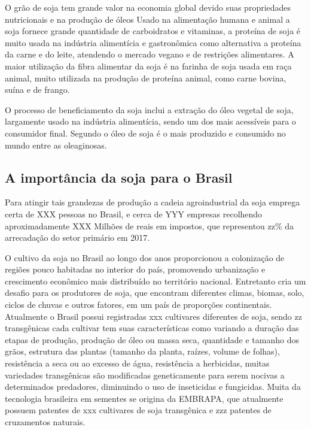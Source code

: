 O grão de soja tem grande valor na economia global devido suas propriedades nutricionais e na produção de óleos
Usado na alimentação humana e animal a soja fornece grande quantidade de carboidratos e vitaminas, a proteína de soja é muito usada na indústria alimentícia e gastronômica como alternativa a proteína da carne e do leite, atendendo o mercado vegano e de restrições alimentares. A maior utilização da fibra alimentar da soja é na farinha de soja usada em raça animal, muito utilizada na produção de proteína animal, como carne bovina, suína e de frango.

O processo de beneficiamento da soja inclui a extração do óleo vegetal de soja, largamente usado na indústria alimentícia, sendo um dos mais acessíveis para o consumidor final. Segundo \cite{FAS2018a} o óleo de soja é o mais produzido e consumido no mundo entre as oleaginosas. 

\subsection{A importância da soja para o Brasil}
Para atingir tais grandezas de produção a cadeia agroindustrial da soja emprega certa de XXX pessoas no Brasil, e cerca de YYY empresas recolhendo aproximadamente XXX Milhões de reais em impostos, que representou zz\% da arrecadação do setor primário em 2017.

O cultivo da soja no Brasil ao longo dos anos proporcionou a colonização de regiões pouco habitadas no interior do país, promovendo urbanização e crescimento econômico mais distribuído no território nacional. Entretanto cria um desafio para os produtores de soja, que encontram diferentes climas, biomas, solo, ciclos de chuvas e outros fatores, em um país de proporções continentais. Atualmente o Brasil possui registradas xxx cultivares diferentes de soja, sendo zz transgênicas cada cultivar tem suas características como variando a duração das etapas de produção, produção de óleo ou massa seca, quantidade e tamanho dos grãos, estrutura das plantas (tamanho da planta, raízes, volume de folhas), resistência a seca ou ao excesso de água, resistência a herbicidas, muitas variedades transgênicas são modificadas geneticamente para serem nocivas a determinados predadores, diminuindo o uso de inseticidas e fungicidas. Muita da tecnologia brasileira em sementes se origina da EMBRAPA, que atualmente possuem patentes de xxx cultivares de soja transgênica e zzz patentes de cruzamentos naturais.

